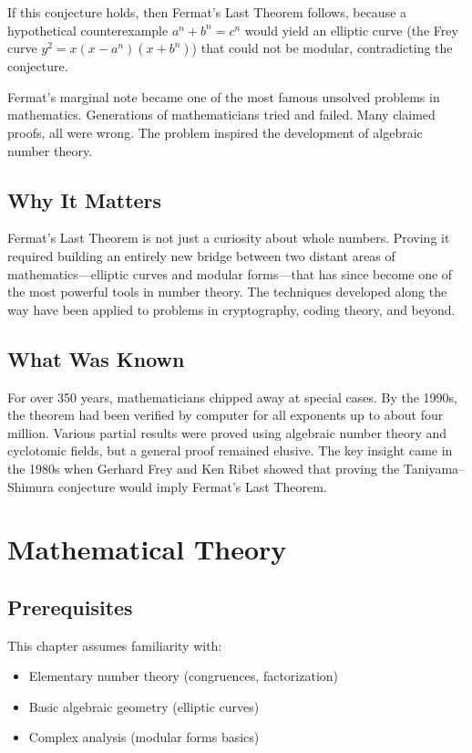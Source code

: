 If this conjecture holds, then Fermat's Last Theorem follows, because a hypothetical counterexample $a^n + b^n = c^n$ would yield an elliptic curve (the Frey curve $y^2 = x(x - a^n)(x + b^n)$) that could not be modular, contradicting the conjecture.

\begin{historicalbox}
Fermat's marginal note became one of the most famous unsolved problems in mathematics. Generations of mathematicians tried and failed. Many claimed proofs, all were wrong. The problem inspired the development of algebraic number theory.
\end{historicalbox}

\subsection{Why It Matters}
Fermat's Last Theorem is not just a curiosity about whole numbers. Proving it required building an entirely new bridge between two distant areas of mathematics---elliptic curves and modular forms---that has since become one of the most powerful tools in number theory. The techniques developed along the way have been applied to problems in cryptography, coding theory, and beyond.

\subsection{What Was Known}
For over 350 years, mathematicians chipped away at special cases. By the 1990s, the theorem had been verified by computer for all exponents up to about four million. Various partial results were proved using algebraic number theory and cyclotomic fields, but a general proof remained elusive. The key insight came in the 1980s when Gerhard Frey and Ken Ribet showed that proving the Taniyama--Shimura conjecture would imply Fermat's Last Theorem.

\section{Mathematical Theory}


\subsection{Prerequisites}
This chapter assumes familiarity with:
\begin{itemize}
\item Elementary number theory (congruences, factorization)
\item Basic algebraic geometry (elliptic curves)
\item Complex analysis (modular forms basics)
\end{itemize}

